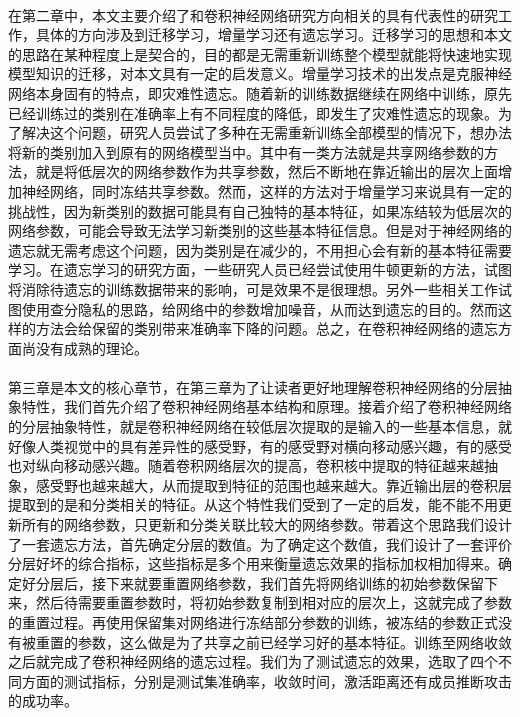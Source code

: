 \paragraph{}在第二章中，本文主要介绍了和卷积神经网络研究方向相关的具有代表性的研究工作，具体的方向涉及到迁移学习，增量学习还有遗忘学习。迁移学习的思想和本文的思路在某种程度上是契合的，目的都是无需重新训练整个模型就能将快速地实现模型知识的迁移，对本文具有一定的启发意义。增量学习技术的出发点是克服神经网络本身固有的特点，即灾难性遗忘。随着新的训练数据继续在网络中训练，原先已经训练过的类别在准确率上有不同程度的降低，即发生了灾难性遗忘的现象。为了解决这个问题，研究人员尝试了多种在无需重新训练全部模型的情况下，想办法将新的类别加入到原有的网络模型当中。其中有一类方法就是共享网络参数的方法，就是将低层次的网络参数作为共享参数，然后不断地在靠近输出的层次上面增加神经网络，同时冻结共享参数。然而，这样的方法对于增量学习来说具有一定的挑战性，因为新类别的数据可能具有自己独特的基本特征，如果冻结较为低层次的网络参数，可能会导致无法学习新类别的这些基本特征信息。但是对于神经网络的遗忘就无需考虑这个问题，因为类别是在减少的，不用担心会有新的基本特征需要学习。在遗忘学习的研究方面，一些研究人员已经尝试使用牛顿更新的方法，试图将消除待遗忘的训练数据带来的影响，可是效果不是很理想。另外一些相关工作试图使用查分隐私的思路，给网络中的参数增加噪音，从而达到遗忘的目的。然而这样的方法会给保留的类别带来准确率下降的问题。总之，在卷积神经网络的遗忘方面尚没有成熟的理论。
\paragraph{}第三章是本文的核心章节，在第三章为了让读者更好地理解卷积神经网络的分层抽象特性，我们首先介绍了卷积神经网络基本结构和原理。接着介绍了卷积神经网络的分层抽象特性，就是卷积神经网络在较低层次提取的是输入的一些基本信息，就好像人类视觉中的具有差异性的感受野，有的感受野对横向移动感兴趣，有的感受也对纵向移动感兴趣。随着卷积网络层次的提高，卷积核中提取的特征越来越抽象，感受野也越来越大，从而提取到特征的范围也越来越大。靠近输出层的卷积层提取到的是和分类相关的特征。从这个特性我们受到了一定的启发，能不能不用更新所有的网络参数，只更新和分类关联比较大的网络参数。带着这个思路我们设计了一套遗忘方法，首先确定分层的数值。为了确定这个数值，我们设计了一套评价分层好坏的综合指标，这些指标是多个用来衡量遗忘效果的指标加权相加得来。确定好分层后，接下来就要重置网络参数，我们首先将网络训练的初始参数保留下来，然后待需要重置参数时，将初始参数复制到相对应的层次上，这就完成了参数的重置过程。再使用保留集对网络进行冻结部分参数的训练，被冻结的参数正式没有被重置的参数，这么做是为了共享之前已经学习好的基本特征。训练至网络收敛之后就完成了卷积神经网络的遗忘过程。我们为了测试遗忘的效果，选取了四个不同方面的测试指标，分别是测试集准确率，收敛时间，激活距离还有成员推断攻击的成功率。
